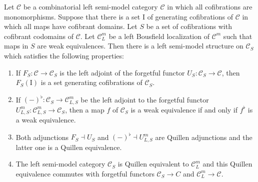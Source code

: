\documentclass[reqno]{amsart}
\theoremstyle{definition}
\theoremstyle{remark}
\newcommand{\fs}[1]{\mathrm{#1}}
\newcommand{\cat}[1]{\mathcal{#1}}
\newcommand{\C}{\cat{C}}
\newcommand{\I}{\fs{I}}
\numberwithin{figure}{section}
\begin{document}
\begin{thm}
Let $\C$ be a combinatorial left semi-model category $\C$ in which all cofibrations are monomorphisms.
Suppose that there is a set $\I$ of generating cofibrations of $\C$ in which all maps have cofibrant domains.
Let $S$ be a set of cofibrations with cofibrant codomains of $\C$.
Let $\C^m_L$ be a left Bousfield localization of $\C^m$ such that maps in $S$ are weak equivalences.
Then there is a left semi-model structure on $\C_S$ which satisfies the following properties:
\begin{enumerate}
\item \label{it:alg-cof} If $F_S : \C \to \C_S$ is the left adjoint of the forgetful functor $U_S : \C_S \to \C$, then $F_S(\I)$ is a set generating cofibrations of $\C_S$.
\item \label{it:alg-we} If $(-)^\flat : \C_S \to \C^m_{L,S}$ be the left adjoint to the forgetful functor $U^m_{L,S} : \C^m_{L,S} \to \C_S$, then a map $f$ of $\C_S$ is a weak equivalence if and only if $f^\flat$ is a weak equivalence.
\item Both adjunctions $F_S \dashv U_S$ and $(-)^\flat \dashv U^m_{L,S}$ are Quillen adjunctions and the latter one is a Quillen equivalence.
\item The left semi-model category $\C_S$ is Quillen equivalent to $\C^m_L$ and this Quillen equivalence commutes with forgetful functors $\C_S \to C$ and $\C^m_L \to \C$.
\end{enumerate}
\end{thm}
\end{document}
